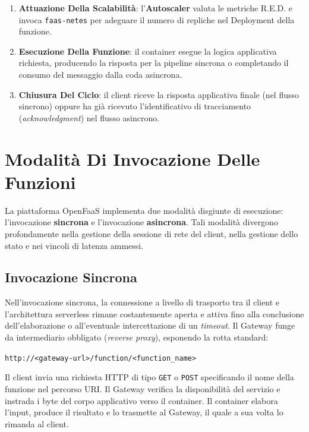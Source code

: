 \documentclass[11pt, a4paper]{article}
\begin{document}
\begin{enumerate}
    \item \textbf{Attuazione Della Scalabilità}: l'\textbf{Autoscaler} valuta le metriche R.E.D. e invoca \texttt{faas-netes} per adeguare il numero di repliche nel Deployment della funzione.
    \item \textbf{Esecuzione Della Funzione}: il container esegue la logica applicativa richiesta, producendo la risposta per la pipeline sincrona o completando il consumo del messaggio dalla coda asincrona.
    \item \textbf{Chiusura Del Ciclo}: il client riceve la risposta applicativa finale (nel flusso sincrono) oppure ha già ricevuto l'identificativo di tracciamento (\emph{acknowledgment}) nel flusso asincrono.
\end{enumerate}

\newpage


\section{Modalità Di Invocazione Delle Funzioni}

La piattaforma OpenFaaS implementa due modalità disgiunte di esecuzione: l'invocazione \textbf{sincrona} e l'invocazione \textbf{asincrona}. Tali modalità divergono profondamente nella gestione della sessione di rete del client, nella gestione dello stato e nei vincoli di latenza ammessi.

\subsection{Invocazione Sincrona}

Nell'invocazione sincrona, la connessione a livello di trasporto tra il client e l'architettura serverless rimane costantemente aperta e attiva fino alla conclusione dell'elaborazione o all'eventuale intercettazione di un \emph{timeout}. Il Gateway funge da intermediario obbligato (\emph{reverse proxy}), esponendo la rotta standard:
\begin{center}
    \texttt{http://<gateway-url>/function/<function\_name>}
\end{center}

Il client invia una richiesta HTTP di tipo \texttt{GET} o \texttt{POST} specificando il nome della funzione nel percorso URI. Il Gateway verifica la disponibilità del servizio e instrada i byte del corpo applicativo verso il container. Il container elabora l'input, produce il risultato e lo trasmette al Gateway, il quale a sua volta lo rimanda al client.
\end{document}
